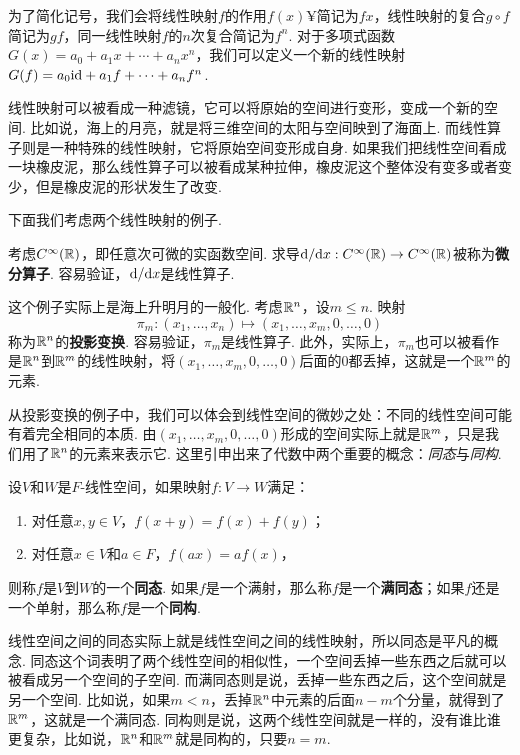 为了简化记号，我们会将线性映射$f$的作用$f(x)¥$简记为$fx$，线性映射的复合$g\circ f$简记为$gf$，同一线性映射$f$的$n$次复合简记为$f^n$. 对于多项式函数$G(x)=a_0+a_1x+\cdots+a_nx^n$，我们可以定义一个新的线性映射$G(f)=a_0\mathrm{id}+a_1f+\cdots+a_nf^n$. 

线性映射可以被看成一种滤镜，它可以将原始的空间进行变形，变成一个新的空间. 比如说，海上的月亮，就是将三维空间的太阳与空间映到了海面上. 而线性算子则是一种特殊的线性映射，它将原始空间变形成自身. 如果我们把线性空间看成一块橡皮泥，那么线性算子可以被看成某种拉伸，橡皮泥这个整体没有变多或者变少，但是橡皮泥的形状发生了改变. 

下面我们考虑两个线性映射的例子. 

\begin{example}[微分算子]
考虑$C^\infty(\mathbb{R})$，即任意次可微的实函数空间. 求导$\mathrm{d}/\mathrm{d} x:C^\infty(\mathbb{R})\to C^\infty(\mathbb{R})$被称为\textbf{微分算子}. 容易验证，$\mathrm{d}/\mathrm{d} x$是线性算子. 
\end{example}

\begin{example}[投影变换]
这个例子实际上是海上升明月的一般化. 考虑$\mathbb{R}^n$，设$m\leq n$. 映射
\[\pi_m:(x_1,\dots,x_n)\mapsto (x_1,\dots,x_m,0,\dots,0)\]
称为$\mathbb{R}^n$的\textbf{投影变换}. 容易验证，$\pi_m$是线性算子. 此外，实际上，$\pi_m$也可以被看作是$\mathbb{R}^n$到$\mathbb{R}^m$的线性映射，将$(x_1,\dots,x_m,0,\dots,0)$后面的$0$都丢掉，这就是一个$\mathbb{R}^m$的元素. 
\end{example}

从投影变换的例子中，我们可以体会到线性空间的微妙之处：不同的线性空间可能有着完全相同的本质. 由$(x_1,\dots,x_m,0,\dots,0)$形成的空间实际上就是$\mathbb{R}^m$，只是我们用了$\mathbb{R}^n$的元素来表示它. 这里引申出来了代数中两个重要的概念：\emph{同态}与\emph{同构}. 

\begin{definition}[同态与同构]
设$V$和$W$是$F$-线性空间，如果映射$f:V\to W$满足：
\begin{enumerate}
    \item 对任意$x,y\in V$，$f(x+y)=f(x)+f(y)$；
    \item 对任意$x\in V$和$a\in F$，$f(ax)=af(x)$，
\end{enumerate}
则称$f$是$V$到$W$的一个\textbf{同态}. 如果$f$是一个满射，那么称$f$是一个\textbf{满同态}；如果$f$还是一个单射，那么称$f$是一个\textbf{同构}. 
\end{definition}

线性空间之间的同态实际上就是线性空间之间的线性映射，所以同态是平凡的概念. 同态这个词表明了两个线性空间的相似性，一个空间丢掉一些东西之后就可以被看成另一个空间的子空间. 而满同态则是说，丢掉一些东西之后，这个空间就是另一个空间. 比如说，如果$m<n$，丢掉$\mathbb{R}^n$中元素的后面$n-m$个分量，就得到了$\mathbb{R}^m$，这就是一个满同态. 同构则是说，这两个线性空间就是一样的，没有谁比谁更复杂，比如说，$\mathbb{R}^n$和$\mathbb{R}^m$就是同构的，只要$n=m$. 

